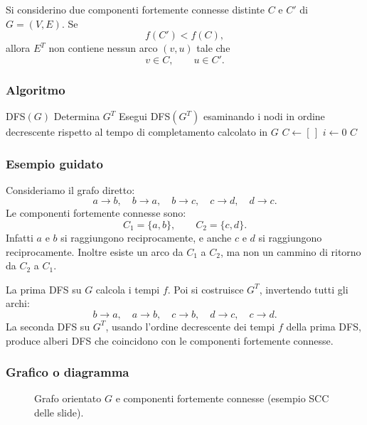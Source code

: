 \begin{corollario}
Si considerino due componenti fortemente connesse distinte $C$ e $C'$ di $G=(V,E)$. Se
\[
f(C')<f(C),
\]
allora $E^T$ non contiene nessun arco $(v,u)$ tale che
\[
v\in C,\qquad u\in C'.
\]
\end{corollario}

\subsubsection{Algoritmo}
\begin{algorithm}[H]
	\caption{\textsc{Strongly-Connected-Components}$(G)$}
	\textsc{DFS}$(G)$
	Determina $G^T$\;
	Esegui \textsc{DFS}$(G^T)$ esaminando i nodi in ordine decrescente rispetto al tempo di completamento calcolato in $G$\;
	$C\gets[\,]$\;
	$i\gets 0$\;
	\Return $C$\;
\end{algorithm}

\subsubsection{Esempio guidato}
Consideriamo il grafo diretto:
\[
a\to b,\quad b\to a,\quad b\to c,\quad c\to d,\quad d\to c.
\]
Le componenti fortemente connesse sono:
\[
C_1=\{a,b\},\qquad C_2=\{c,d\}.
\]
Infatti $a$ e $b$ si raggiungono reciprocamente, e anche $c$ e $d$ si raggiungono reciprocamente. Inoltre esiste un arco da $C_1$ a $C_2$, ma non un cammino di ritorno da $C_2$ a $C_1$.

La prima DFS su $G$ calcola i tempi $f$. Poi si costruisce $G^T$, invertendo tutti gli archi:
\[
b\to a,\quad a\to b,\quad c\to b,\quad d\to c,\quad c\to d.
\]
La seconda DFS su $G^T$, usando l'ordine decrescente dei tempi $f$ della prima DFS, produce alberi DFS che coincidono con le componenti fortemente connesse.

\subsubsection{Grafico o diagramma}
\begin{figure}[H]
	\centering
	\caption{Grafo orientato $G$ e componenti fortemente connesse (esempio SCC delle slide).}
\end{figure}

